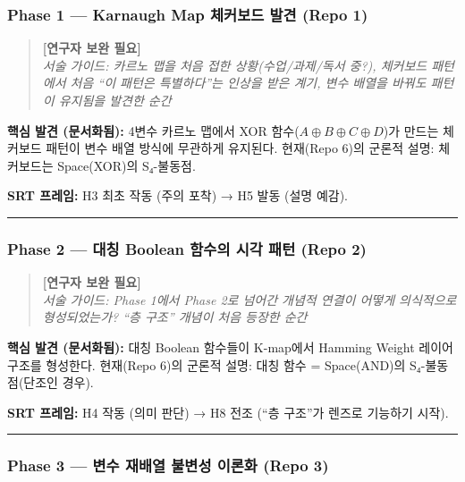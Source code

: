 \documentclass[
]{article}
\begin{document}
\subsubsection{Phase 1 --- Karnaugh Map 체커보드 발견 (Repo
1)}\label{phase-1-karnaugh-map-uxccb4uxcee4uxbcf4uxb4dc-uxbc1cuxacac-repo-1}

\begin{quote}
\textbf{{[}연구자 보완 필요{]}}\\
\emph{서술 가이드: 카르노 맵을 처음 접한 상황(수업/과제/독서 중?),
체커보드 패턴에서 처음 ``이 패턴은 특별하다''는 인상을 받은 계기, 변수
배열을 바꿔도 패턴이 유지됨을 발견한 순간}
\end{quote}

\textbf{핵심 발견 (문서화됨):} 4변수 카르노 맵에서 XOR
함수(\(A \oplus B \oplus C \oplus D\))가 만드는 체커보드 패턴이 변수
배열 방식에 무관하게 유지된다. 현재(Repo 6)의 군론적 설명: 체커보드는
Space(XOR)의 S₄-불동점.

\textbf{SRT 프레임:} H3 최초 작동 (주의 포착) → H5 발동 (설명 예감).

\begin{center}\rule{0.5\linewidth}{0.5pt}\end{center}

\subsubsection{Phase 2 --- 대칭 Boolean 함수의 시각 패턴 (Repo
2)}\label{phase-2-uxb300uxce6d-boolean-uxd568uxc218uxc758-uxc2dcuxac01-uxd328uxd134-repo-2}

\begin{quote}
\textbf{{[}연구자 보완 필요{]}}\\
\emph{서술 가이드: Phase 1에서 Phase 2로 넘어간 개념적 연결이 어떻게
의식적으로 형성되었는가? ``층 구조'' 개념이 처음 등장한 순간}
\end{quote}

\textbf{핵심 발견 (문서화됨):} 대칭 Boolean 함수들이 K-map에서 Hamming
Weight 레이어 구조를 형성한다. 현재(Repo 6)의 군론적 설명: 대칭 함수 =
Space(AND)의 S₄-불동점(단조인 경우).

\textbf{SRT 프레임:} H4 작동 (의미 판단) → H8 전조 (``층 구조''가 렌즈로
기능하기 시작).

\begin{center}\rule{0.5\linewidth}{0.5pt}\end{center}

\subsubsection{Phase 3 --- 변수 재배열 불변성 이론화 (Repo
3)}\label{phase-3-uxbcc0uxc218-uxc7acuxbc30uxc5f4-uxbd88uxbcc0uxc131-uxc774uxb860uxd654-repo-3}
\end{document}
